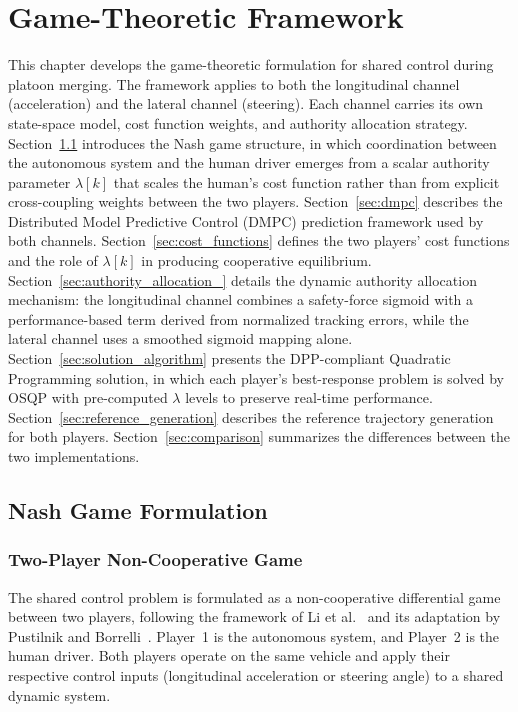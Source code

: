 \documentclass[12pt,a4paper,oneside]{report}
\begin{document}
\chapter{Game-Theoretic Framework}
\label{ch:game_theory}

This chapter develops the game-theoretic formulation for shared control during platoon merging. The framework applies to both the longitudinal channel (acceleration) and the lateral channel (steering). Each channel carries its own state-space model, cost function weights, and authority allocation strategy. Section~\ref{sec:nash_formulation} introduces the Nash game structure, in which coordination between the autonomous system and the human driver emerges from a scalar authority parameter $\lambda[k]$ that scales the human's cost function rather than from explicit cross-coupling weights between the two players. Section~\ref{sec:dmpc} describes the Distributed Model Predictive Control (DMPC) prediction framework used by both channels. Section~\ref{sec:cost_functions} defines the two players' cost functions and the role of $\lambda[k]$ in producing cooperative equilibrium. Section~\ref{sec:authority_allocation_} details the dynamic authority allocation mechanism: the longitudinal channel combines a safety-force sigmoid with a performance-based term derived from normalized tracking errors, while the lateral channel uses a smoothed sigmoid mapping alone. Section~\ref{sec:solution_algorithm} presents the DPP-compliant Quadratic Programming solution, in which each player's best-response problem is solved by OSQP with pre-computed $\lambda$ levels to preserve real-time performance. Section~\ref{sec:reference_generation} describes the reference trajectory generation for both players. Section~\ref{sec:comparison} summarizes the differences between the two implementations.


\section{Nash Game Formulation}
\label{sec:nash_formulation}

\subsection{Two-Player Non-Cooperative Game}

The shared control problem is formulated as a non-cooperative differential game between two players, following the framework of Li et al.~\cite{liSharedControlNovel2019} and its adaptation by Pustilnik and Borrelli~\cite{pustilnikGeneralizedNashEquilibrium2025}. Player~1 is the autonomous system, and Player~2 is the human driver. Both players operate on the same vehicle and apply their respective control inputs (longitudinal acceleration or steering angle) to a shared dynamic system.
\end{document}
